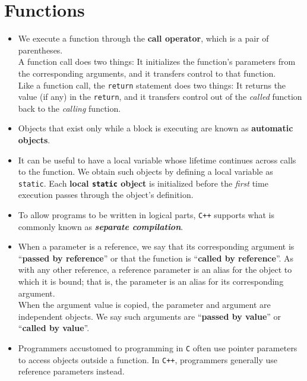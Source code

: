 \section{Functions}
\begin{itemize}

\item
We execute a function through the \textbf{call operator}, which is a pair of parentheses.\\
A function call does two things: It initializes the function's parameters from the corresponding arguments, and it transfers control to that function.\\
Like a function call, the \texttt{return} statement does two things: It returns the value (if any) in the \texttt{return}, and it transfers control out of the \textit{called} function back to the \textit{calling} function.

\item
Objects that exist only while a block is executing are known as \textbf{automatic objects}.

\item
It can be useful to have a local variable whose lifetime continues across calls to the function. We obtain such objects by defining a local variable as \texttt{static}. Each \textbf{local \texttt{static} object} is initialized before the \textit{first} time execution passes through the object's definition.

\item
To allow programs to be written in logical parts, \texttt{C++} supports what is commonly known as \textbf{\textit{separate compilation}}.

\item
When a parameter is a reference, we say that its corresponding argument is ``\textbf{passed by reference}'' or that the function is ``\textbf{called by reference}''. As with any other reference, a reference parameter is an alias for the object to which it is bound; that is, the parameter is an alias for its corresponding argument.\\
When the argument value is copied, the parameter and argument are independent objects. We say such arguments are ``\textbf{passed by value}'' or ``\textbf{called by value}''.

\item
Programmers accustomed to programming in \texttt{C} often use pointer parameters to access objects outside a function. In \texttt{C++}, programmers generally use reference parameters instead.


\end{itemize}
